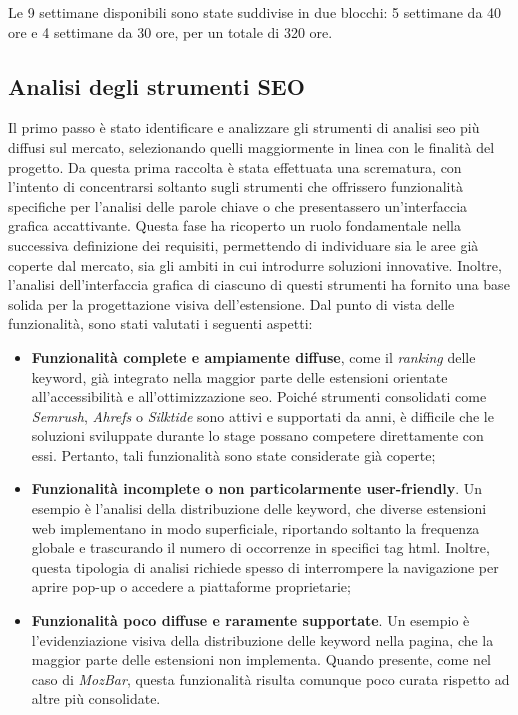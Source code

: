 \vspace{5pt}
\par\noindent Le 9 settimane disponibili sono state suddivise in due blocchi: 5 settimane da 40 ore e 4 settimane da 30 ore, per un totale di 320 ore.

\subsection{Analisi degli strumenti SEO}

\par Il primo passo è stato identificare e analizzare gli strumenti di analisi \gls{seo} più diffusi sul mercato, selezionando quelli maggiormente in linea con le finalità del progetto. Da questa prima raccolta è stata effettuata una scrematura, con l’intento di concentrarsi soltanto sugli strumenti che offrissero funzionalità specifiche per l’analisi delle parole chiave o che presentassero un’interfaccia grafica accattivante. Questa fase ha ricoperto un ruolo fondamentale nella successiva definizione dei \gls{requisiti}, permettendo di individuare sia le aree già coperte dal mercato, sia gli ambiti in cui introdurre soluzioni innovative. Inoltre, l’analisi dell’interfaccia grafica di ciascuno di questi strumenti ha fornito una base solida per la progettazione visiva dell’estensione. Dal punto di vista delle funzionalità, sono stati valutati i seguenti aspetti:

\begin{itemize}
  \item \textbf{Funzionalità complete e ampiamente diffuse}, come il \textit{ranking} delle keyword, già integrato nella maggior parte delle estensioni orientate all’accessibilità e all’ottimizzazione \gls{seo}. Poiché strumenti consolidati come \textit{Semrush}, \textit{Ahrefs} o \textit{Silktide} sono attivi e supportati da anni, è difficile che le soluzioni sviluppate durante lo stage possano competere direttamente con essi. Pertanto, tali funzionalità sono state considerate già coperte;
  \item \textbf{Funzionalità incomplete o non particolarmente user-friendly}. Un esempio è l’analisi della distribuzione delle keyword, che diverse estensioni web implementano in modo superficiale, riportando soltanto la frequenza globale e trascurando il numero di occorrenze in specifici tag \gls{html}. Inoltre, questa tipologia di analisi richiede spesso di interrompere la navigazione per aprire pop-up o accedere a piattaforme proprietarie;
  \item \textbf{Funzionalità poco diffuse e raramente supportate}. Un esempio è l’evidenziazione visiva della distribuzione delle keyword nella pagina, che la maggior parte delle estensioni non implementa. Quando presente, come nel caso di \textit{MozBar}, questa funzionalità risulta comunque poco curata rispetto ad altre più consolidate.
\end{itemize}

